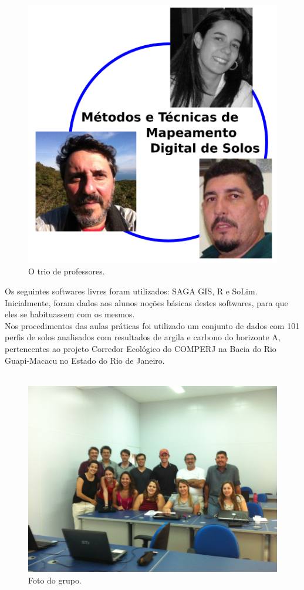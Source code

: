 \begin{figure}[htbp]
   \centering
   \includegraphics[width=0.95\linewidth]{figuras/trio}
   \caption{O trio de professores.}
   \label{fig:foto-trio}
\end{figure}
\noindent Os seguintes softwares livres foram utilizados: SAGA GIS, R e SoLim. Inicialmente, foram dados aos alunos noções básicas destes softwares, para que eles se habituassem com os mesmos.\\
Nos procedimentos das aulas práticas foi utilizado um conjunto de dados com 101 perfis de solos analisados com resultados de argila e carbono do horizonte A, pertencentes ao projeto Corredor Ecológico do COMPERJ na Bacia do Rio Guapi-Macacu no Estado do Rio de Janeiro.\\
\\
\begin{figure}[htbp]
   \centering
   \includegraphics[width=0.95\linewidth]{figuras/foto-waldir.jpg}
   \caption{Foto do grupo.}
   \label{fig:foto}
\end{figure}
